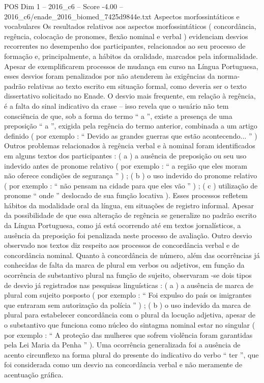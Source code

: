 \begin{textsample}{POS Dim 1 – 2016\_c6 – Score -4.00 – 2016\_c6/enade\_2016\_biomed\_7425d9844e.txt}
Aspectos morfossintáticos e vocabulares Os resultados relativos aos aspectos morfossintáticos ( concordância, regência, colocação de pronomes, flexão nominal e verbal ) evidenciam desvios recorrentes no desempenho dos participantes, relacionados ao seu processo de formação e, principalmente, a hábitos da oralidade, marcados pela informalidade.
Apesar de exemplificarem processos de mudança em curso na Língua Portuguesa, esses desvios foram penalizados por não atenderem às exigências da norma-padrão relativas ao texto escrito em situação formal, como deveria ser o texto dissertativo solicitado no Enade.
O desvio mais frequente, em relação à regência, é a falta do sinal indicativo da crase – isso revela que o usuário não tem consciência de que, sob a forma do termo “ a ”, existe a presença de uma preposição “ a ”, exigida pela regência do termo anterior, combinada a um artigo definido ( por exemplo : “ Devido as grandes guerras que estão acontecendo... ” ) Outros problemas relacionados à regência verbal e à nominal foram identificados em alguns textos dos participantes : ( a ) a ausência de preposição ou seu uso indevido antes de pronome relativo ( por exemplo : “ a região que eles moram não oferece condições de segurança ” ) ; ( b ) o uso indevido do pronome relativo ( por exemplo : “ não pensam na cidade para que eles vão ” ) ; ( c ) utilização de pronome “ onde ” deslocado de sua função locativa ).
Esses processos refletem hábitos da modalidade oral da língua, em situações de registro informal.
Apesar da possibilidade de que essa alteração de regência se generalize no padrão escrito da Língua Portuguesa, como já está ocorrendo até em textos jornalísticos, a ausência da preposição foi penalizada neste processo de avaliação.
Outro desvio observado nos textos diz respeito aos processos de concordância verbal e de concordância nominal.
Quanto à concordância de número, além das ocorrências já conhecidas de falta da marca de plural em verbos ou adjetivos, em função da ocorrência de substantivo plural na função de sujeito, observaram -se dois tipos de desvio já registrados nas pesquisas linguísticas : ( a ) a ausência de marca de plural com sujeito posposto ( por exemplo : “ Foi expulso do país os imigrantes que entraram sem autorização da polícia ” ) ; ( b ) o uso indevido da marca de plural para estabelecer concordância com o plural da locução adjetiva, apesar de o substantivo que funciona como núcleo do sintagma nominal estar no singular ( por exemplo : “ A proteção das mulheres que sofrem violência foram garantidas pela Lei Maria da Penha ” ).
Uma ocorrência generalizada foi a ausência de acento circunflexo na forma plural do presente do indicativo do verbo “ ter ”, que foi considerada como um desvio na concordância verbal e não meramente de acentuação gráfica.

\end{textsample}
